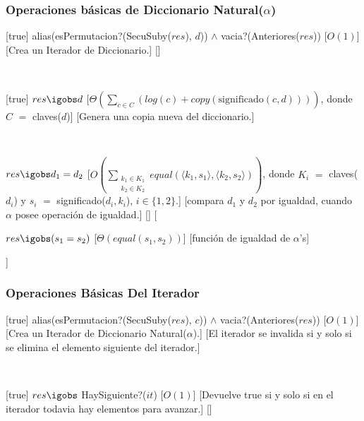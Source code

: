 \subsubsection{Operaciones básicas de Diccionario Natural($\alpha$)}


[true]
{alias(esPermutacion?(SecuSuby($res$), $d$)) $\land$ vacia?(Anteriores($res$))}
[$O(1)$]
[Crea un Iterador de Diccionario.]
[]

~

[true]
{$res \igobs d$}
[$\displaystyle\Theta\left(\sum_{c \in C}\left(log(c) + copy(\text{significado}(c,d))\right)\right)$, donde $C$ $=$ claves($d$)]
[Genera una copia nueva del diccionario.]

~

  {$res \igobs d_1 = d_2$}
  [$\displaystyle O\left(\sum_{\substack{k_1 \in K_1\\k_2\in K_2}}equal(\langle k_1,s_1\rangle, \langle k_2, s_2 \rangle)\right)$, donde $K_i$ $=$ claves($d_i$) y $s_i$ $=$ significado($d_i, k_i$), $i \in \{1,2\}$.]
  [compara $d_1$ y $d_2$ por igualdad, cuando $\alpha$ posee operación de igualdad.]
  []%
  [{\parbox[t]{\textwidth-3cm}{%
    {$res \igobs (s_1 = s_2)$}
    [$\Theta(equal(s_1, s_2))$]
    [función de igualdad de $\alpha$'s]
  }}]






\subsubsection{Operaciones Básicas Del Iterador}

[true]
{alias(esPermutacion?(SecuSuby($res$), $c$)) $\land$ vacia?(Anteriores($res$))}
[$O(1)$]
[Crea un Iterador de Diccionario Natural($\alpha$).]
[El iterador se invalida si y solo si se elimina el elemento siguiente del iterador.]

~

[true]
{$res \igobs$ HaySiguiente?($it$)}
[$O(1)$]
[Devuelve true si y solo si en el iterador todavia hay elementos para avanzar.]
[]


